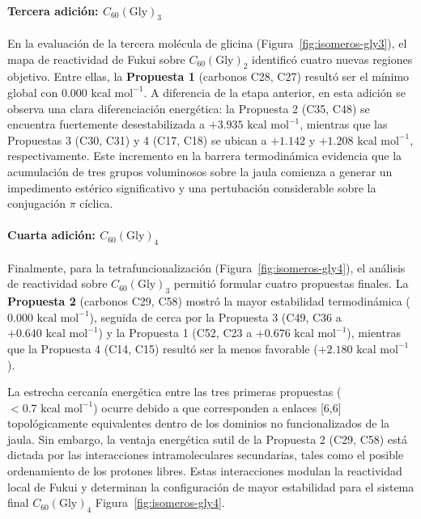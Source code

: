 \paragraph{Tercera adición: $C_{60}(\text{Gly})_3$}
En la evaluación de la tercera molécula de glicina (Figura~\ref{fig:isomeros-gly3}), el mapa de reactividad de Fukui sobre $C_{60}(\text{Gly})_2$ identificó cuatro nuevas regiones objetivo. Entre ellas, la \textbf{Propuesta 1} (carbonos C28, C27) resultó ser el mínimo global con $0.000\text{ kcal mol}^{-1}$. A diferencia de la etapa anterior, en esta adición se observa una clara diferenciación energética: la Propuesta 2 (C35, C48) se encuentra fuertemente desestabilizada a $+3.935\text{ kcal mol}^{-1}$, mientras que las Propuestas 3 (C30, C31) y 4 (C17, C18) se ubican a $+1.142$ y $+1.208\text{ kcal mol}^{-1}$, respectivamente. Este incremento en la barrera termodinámica evidencia que la acumulación de tres grupos voluminosos sobre la jaula comienza a generar un impedimento estérico significativo y una pertubación considerable sobre la conjugación $\pi$ cíclica.

\paragraph{Cuarta adición: $C_{60}(\text{Gly})_4$}
Finalmente, para la tetrafuncionalización (Figura~\ref{fig:isomeros-gly4}), el análisis de reactividad sobre $C_{60}(\text{Gly})_3$ permitió formular cuatro propuestas finales. La \textbf{Propuesta 2} (carbonos C29, C58) mostró la mayor estabilidad termodinámica ($0.000\text{ kcal mol}^{-1}$), seguida de cerca por la Propuesta 3 (C49, C36 a $+0.640\text{ kcal mol}^{-1}$) y la Propuesta 1 (C52, C23 a $+0.676\text{ kcal mol}^{-1}$), mientras que la Propuesta 4 (C14, C15) resultó ser la menos favorable ($+2.180\text{ kcal mol}^{-1}$). 

La estrecha cercanía energética entre las tres primeras propuestas ($< 0.7\text{ kcal mol}^{-1}$) ocurre debido a que corresponden a enlaces [6,6] topológicamente equivalentes dentro de los dominios no funcionalizados de la jaula. Sin embargo, la ventaja energética sutil de la Propuesta 2 (C29, C58) está dictada por las interacciones intramoleculares secundarias, tales como el posible ordenamiento de los protones libres. Estas interacciones modulan la reactividad local de Fukui y determinan la configuración de mayor estabilidad para el sistema final $C_{60}(\text{Gly})_4$ Figura~\ref{fig:isomeros-gly4}.  
